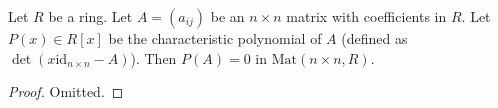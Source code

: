 \begin{lemma}
\label{lemma-charpoly}
Let $R$ be a ring. Let $A = (a_{ij})$ be an $n\times n$
matrix with coefficients in $R$. Let $P(x) \in R[x]$
be the characteristic polynomial of $A$ (defined
as $\det(x\text{id}_{n\times n} - A)$).
Then $P(A) = 0$ in $\text{Mat}(n\times n, R)$.
\end{lemma}

\begin{proof}
Omitted.
\end{proof}








